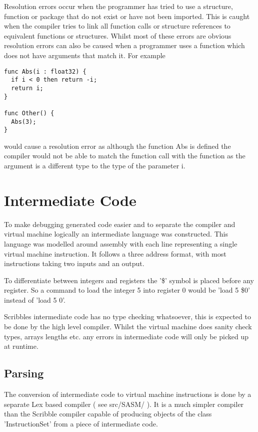 \documentclass[]{final_report}
\begin{document}
Resolution errors occur when the programmer has tried to use a structure, function or package that do not exist or have not been imported. This is caught when the compiler tries to link all function calls or structure references to equivalent functions or structures. Whilst most of these errors are obvious resolution errors can also be caused when a programmer uses a function which does not have arguments that match it. For example
 
\begin{verbatim}
func Abs(i : float32) {
  if i < 0 then return -i;
  return i;
}

func Other() {
  Abs(3);
}
\end{verbatim}

would cause a resolution error as although the function Abs is defined the compiler would not be able to match the function call with the function as the argument is a different type to the type of the parameter i.

\chapter{Intermediate Code}

To make debugging generated code easier and to separate the compiler and virtual machine logically an intermediate language was constructed. This language was modelled around assembly with each line representing a single virtual machine instruction. It follows a three address format, with most instructions taking two inputs and an output.

To differentiate between integers and registers the '\$' symbol is placed before any register. So a command to load the integer 5 into register 0 would be 'load 5 \$0' instead of 'load 5 0'.

Scribbles intermediate code has no type checking whatsoever, this is expected to be done by the high level compiler. Whilst the virtual machine does sanity check types, arrays lengths etc. any errors in intermediate code will only be picked up at runtime.

\section{Parsing}

The conversion of intermediate code to virtual machine instructions is done by a separate Lex based compiler ( see src/SASM/ ). It is a much simpler compiler than the Scribble compiler capable of producing objects of the class 'InstructionSet' from a piece of intermediate code.
\end{document}
